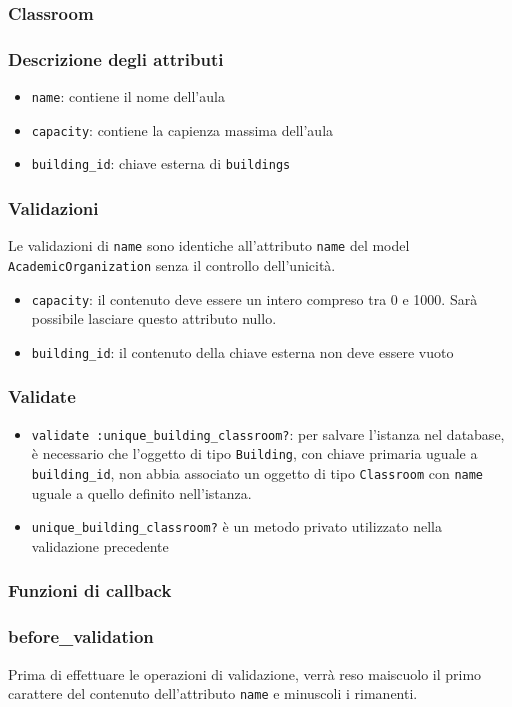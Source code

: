 \documentclass[11pt,a4paper]{article}
\begin{document}
\subsubsection{Classroom}
\subsubsection*{Descrizione degli attributi}
\begin{itemize}
 \item \verb|name|: contiene il nome dell'aula
 \item \verb|capacity|: contiene la capienza massima dell'aula
 \item \verb|building_id|: chiave esterna di \verb|buildings|	
\end{itemize}
\subsubsection*{Validazioni}
Le validazioni di \verb|name| sono identiche all'attributo \verb|name| del model \\ \verb|AcademicOrganization| senza il controllo dell'unicità.
\begin{itemize}
\item \verb|capacity|: il contenuto deve essere un intero compreso tra 0 e 1000. Sarà possibile lasciare questo attributo nullo.
\item \verb|building_id|: il contenuto della chiave esterna non deve essere vuoto 
\end{itemize}
\subsubsection*{Validate}
\begin{itemize}
 \item \verb|validate :unique_building_classroom?|: per salvare l'istanza nel database, è necessario che l'oggetto di tipo \verb|Building|, con chiave primaria uguale a \verb|building_id|, non abbia associato un oggetto di tipo \verb|Classroom| con \verb|name| uguale a quello definito nell'istanza.
\item \verb|unique_building_classroom?| è un metodo privato utilizzato nella validazione precedente
\end{itemize}
\subsubsection*{Funzioni di callback}
\subsubsection*{before\_validation}
Prima di effettuare le operazioni di validazione, verrà reso maiscuolo il primo carattere del contenuto dell'attributo \verb|name| e minuscoli i rimanenti.
\end{document}
